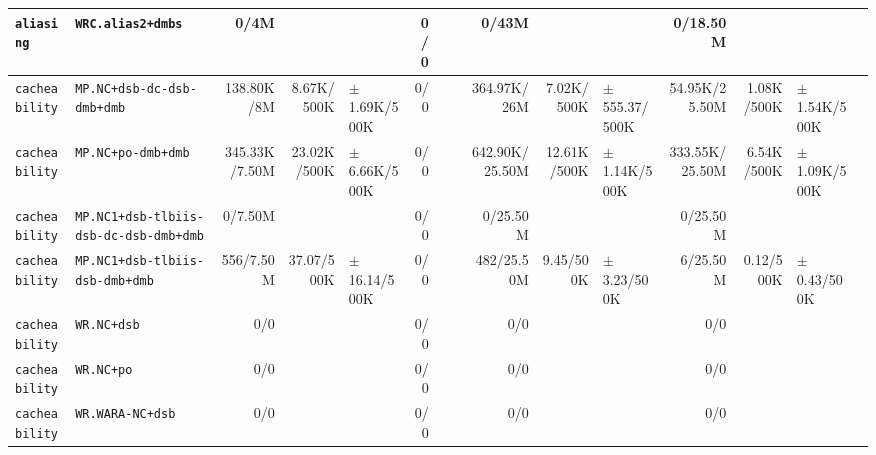 \begin{tabular}{l l  | r r l | r r l | r r l | r r l l}
       \verb|aliasing| &                                      \verb|WRC.alias2+dmbs| &           0/4M &                       &                   &            0/0 &                       &  &          0/43M &                       &                   &       0/18.50M &                       &                    & \\ \hline 
   \verb|cacheability| &                             \verb|MP.NC+dsb-dc-dsb-dmb+dmb| &     138.80K/8M &            8.67K/500K &  $\pm$ 1.69K/500K &            0/0 &                       &  &    364.97K/26M &            7.02K/500K & $\pm$ 555.37/500K &  54.95K/25.50M &            1.08K/500K &   $\pm$ 1.54K/500K & \\ \hline 
   \verb|cacheability| &                                     \verb|MP.NC+po-dmb+dmb| &  345.33K/7.50M &           23.02K/500K &  $\pm$ 6.66K/500K &            0/0 &                       &  & 642.90K/25.50M &           12.61K/500K &  $\pm$ 1.14K/500K & 333.55K/25.50M &            6.54K/500K &   $\pm$ 1.09K/500K & \\ \hline 
   \verb|cacheability| &                 \verb|MP.NC1+dsb-tlbiis-dsb-dc-dsb-dmb+dmb| &        0/7.50M &                       &                   &            0/0 &                       &  &       0/25.50M &                       &                   &       0/25.50M &                       &                    & \\ \hline 
   \verb|cacheability| &                        \verb|MP.NC1+dsb-tlbiis-dsb-dmb+dmb| &      556/7.50M &            37.07/500K &  $\pm$ 16.14/500K &            0/0 &                       &  &     482/25.50M &             9.45/500K &   $\pm$ 3.23/500K &       6/25.50M &             0.12/500K &    $\pm$ 0.43/500K & \\ \hline 
   \verb|cacheability| &                                            \verb|WR.NC+dsb| &            0/0 &                       &                   &            0/0 &                       &  &            0/0 &                       &                   &            0/0 &                       &                    & \\ \hline 
   \verb|cacheability| &                                             \verb|WR.NC+po| &            0/0 &                       &                   &            0/0 &                       &  &            0/0 &                       &                   &            0/0 &                       &                    & \\ \hline 
   \verb|cacheability| &                                       \verb|WR.WARA-NC+dsb| &            0/0 &                       &                   &            0/0 &                       &  &            0/0 &                       &                   &            0/0 &                       &                    & \\ \hline 

\end{tabular}
